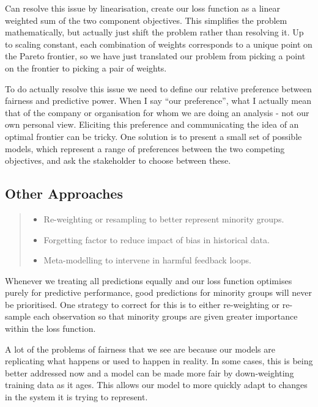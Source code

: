 \documentclass[
  letterpaper,
  DIV=11,
  numbers=noendperiod]{scrreprt}
\providecommand{\tightlist}{%
  \setlength{\itemsep}{0pt}\setlength{\parskip}{0pt}}\usepackage{longtable,booktabs,array}
\begin{document}
Can resolve this issue by linearisation, create our loss function as a
linear weighted sum of the two component objectives. This simplifies the
problem mathematically, but actually just shift the problem rather than
resolving it. Up to scaling constant, each combination of weights
corresponds to a unique point on the Pareto frontier, so we have just
translated our problem from picking a point on the frontier to picking a
pair of weights.

To do actually resolve this issue we need to define our relative
preference between fairness and predictive power. When I say ``our
preference'', what I actually mean that of the company or organisation
for whom we are doing an analysis - not our own personal view. Eliciting
this preference and communicating the idea of an optimal frontier can be
tricky. One solution is to present a small set of possible models, which
represent a range of preferences between the two competing objectives,
and ask the stakeholder to choose between these.

\subsection{Other Approaches}\label{other-approaches}

\begin{quote}
\begin{itemize}
\tightlist
\item
  Re-weighting or resampling to better represent minority groups.
\item
  Forgetting factor to reduce impact of bias in historical data.
\item
  Meta-modelling to intervene in harmful feedback loops.
\end{itemize}
\end{quote}

Whenever we treating all predictions equally and our loss function
optimises purely for predictive performance, good predictions for
minority groups will never be prioritised. One strategy to correct for
this is to either re-weighting or re-sample each observation so that
minority groups are given greater importance within the loss function.

A lot of the problems of fairness that we see are because our models are
replicating what happens or used to happen in reality. In some cases,
this is being better addressed now and a model can be made more fair by
down-weighting training data as it ages. This allows our model to more
quickly adapt to changes in the system it is trying to represent.
\end{document}
